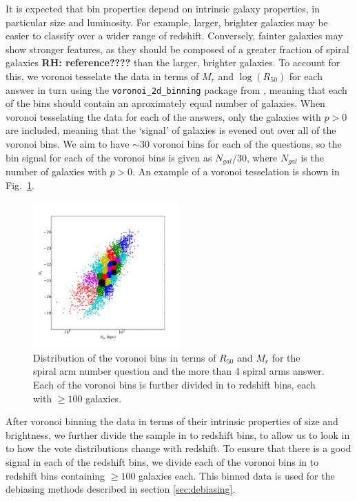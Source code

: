 \documentclass[useAMS,usenatbib]{mn2e}
\newcommand{\rh}[1]{{\bf \textcolor{RoyalPurple}{RH: #1}}}
\begin{document}
It is expected that bin properties depend on intrinsic galaxy properties, in particular size and luminosity. For example, larger, brighter galaxies may be easier to classify over a wider range of redshift. Conversely, fainter galaxies may show stronger features, as they should be composed of a greater fraction of spiral galaxies \rh{reference????} than the larger, brighter galaxies. To account for this, we voronoi tesselate the data in terms of $M_r$ and $\log(R_{50})$ for each answer in turn using the \texttt{voronoi\_2d\_binning} package from \cite{Cappellari_03}, meaning that each of the bins should contain an aproximately equal number of galaxies. When voronoi tesselating the data for each of the answers, only the galaxies with $p>0$ are included, meaning that the `signal' of galaxies is evened out over all of the voronoi bins. We aim to have $\sim 30$ voronoi bins for each of the questions, so the bin signal for each of the voronoi bins is given as $N_{gal}/30$, where $N_{gal}$ is the number of galaxies with $p>0$. An example of a voronoi tesselation is shown in Fig.~\ref{fig:voronoi_bins}. 

\begin{figure}
		\centering

        \includegraphics[width=0.5\textwidth]{Images/Bias/Debiasing/voronoi_bins.pdf}

        \caption{Distribution of the voronoi bins in terms of $R_{50}$ and $M_r$ for the spiral arm number question and the more than 4 spiral arms answer. Each of the voronoi bins is further divided in to redshift bins, each with $\geq 100$ galaxies.}

        \label{fig:voronoi_bins}

\end{figure}

After voronoi binning the data in terms of their intrinsic properties of size and brightness, we further divide the sample in to redshift bins, to allow us to look in to how the vote distributions change with redshift. To ensure that there is a good signal in each of the redshift bins, we divide each of the voronoi bins in to redshift bins containing $\geq 100$ galaxies each. This binned data is used for the debiasing methods described in section \ref{sec:debiasing}.
\end{document}
